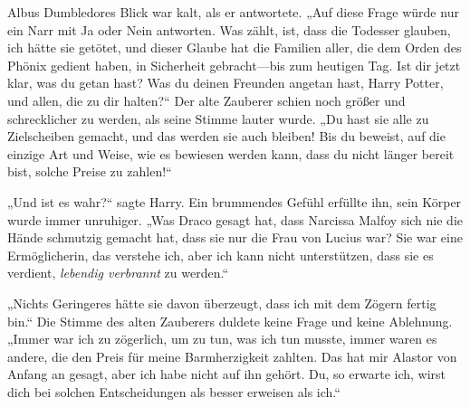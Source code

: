 Albus Dumbledores Blick war kalt, als er antwortete.
„Auf diese Frage würde nur ein Narr mit Ja oder Nein antworten. Was zählt, ist, dass die Todesser glauben, ich hätte sie getötet, und dieser Glaube hat die Familien aller, die dem Orden des Phönix gedient haben, in Sicherheit gebracht—bis zum heutigen Tag. Ist dir jetzt klar, was du getan hast? Was du deinen Freunden angetan hast, Harry Potter, und allen, die zu dir halten?“
Der alte Zauberer schien noch größer und schrecklicher zu werden, als seine Stimme lauter wurde.
„Du hast sie alle zu Zielscheiben gemacht, und das werden sie auch bleiben! Bis du beweist, auf die einzige Art und Weise, wie es bewiesen werden kann, dass du nicht länger bereit bist, solche Preise zu zahlen!“

„Und ist es wahr?“ sagte Harry.
Ein brummendes Gefühl erfüllte ihn, sein Körper wurde immer unruhiger.
„Was Draco gesagt hat, dass Narcissa Malfoy sich nie die Hände schmutzig gemacht hat, dass sie nur die Frau von Lucius war? Sie war eine Ermöglicherin, das verstehe ich, aber ich kann nicht unterstützen, dass sie es verdient, \emph{lebendig verbrannt} zu werden.“

„Nichts Geringeres hätte sie davon überzeugt, dass ich mit dem Zögern fertig bin.“ Die Stimme des alten Zauberers duldete keine Frage und keine Ablehnung.
„Immer war ich zu zögerlich, um zu tun, was ich tun musste, immer waren es andere, die den Preis für meine Barmherzigkeit zahlten. Das hat mir Alastor von Anfang an gesagt, aber ich habe nicht auf ihn gehört. Du, so erwarte ich, wirst dich bei solchen Entscheidungen als besser erweisen als ich.“

